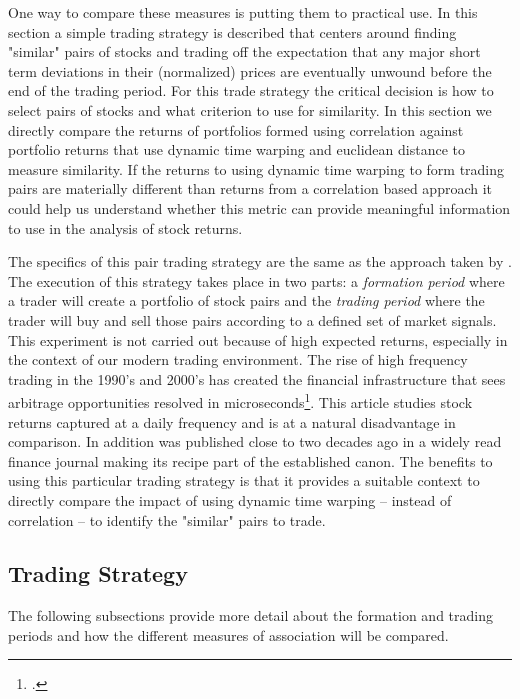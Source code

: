 \documentclass[12pt]{article}
\begin{document}
One way to compare these measures is putting them to practical use. In this section a simple trading strategy is described that centers around finding "similar" pairs of stocks and trading off the expectation that any major short term deviations in their (normalized) prices are eventually unwound before the end of the trading period. For this trade strategy the critical decision is how to select pairs of stocks and what criterion to use for similarity. In this section we directly compare the returns of portfolios formed using correlation against portfolio returns that use dynamic time warping and euclidean distance to measure similarity. If the returns to using dynamic time warping to form trading pairs are materially different than returns from a correlation based approach it could help us understand whether this metric can provide meaningful information to use in the analysis of stock returns.

The specifics of this pair trading strategy are the same as the approach taken by \cite{Gatev_et_al_2006}. The execution of this strategy takes place in two parts: a \textit{formation period} where a trader will create a portfolio of stock pairs and the \textit{trading period} where the trader will buy and sell those pairs according to a defined set of market signals. This experiment is not carried out because of high expected returns, especially in the context of our modern trading environment. The rise of high frequency trading in the 1990's and 2000's has created the financial infrastructure that sees arbitrage opportunities resolved in microseconds\footcite[See][for a more detailed ]{Aquilina_et_al_2021}. This article studies stock returns captured at a daily frequency and is at a natural disadvantage in comparison. In addition \cite{Gatev_et_al_2006} was published close to two decades ago in a widely read finance journal making its recipe part of the established canon. The benefits to using this particular trading strategy is that it provides a suitable context to directly compare the impact of using dynamic time warping -- instead of correlation -- to identify the "similar" pairs to trade.

\subsection{Trading Strategy}

The following subsections provide more detail about the formation and trading periods and how the different measures of association will be compared.
\end{document}
